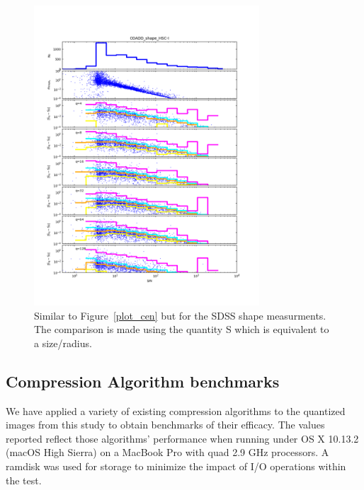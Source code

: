\begin{figure}
\centering
\includegraphics[width=0.75\textwidth]{figure/plot_coadd_shape_HSC-I.png}
\caption{Similar to Figure~\ref{plot_cen} but for the SDSS shape measurments.  The comparison is made using the quantity S which is equivalent to
a size/radius.}
\label{coadd_shape}
\end{figure}






\subsection{Compression Algorithm benchmarks}

We have applied a variety of existing compression algorithms to the quantized images from this study to 
obtain benchmarks of their efficacy.  The values reported reflect those algorithms' performance when
running under OS X 10.13.2 (macOS High Sierra) on a MacBook Pro with quad 2.9 GHz processors.  A ramdisk
was used for storage to minimize the impact of I/O operations within the test.  

